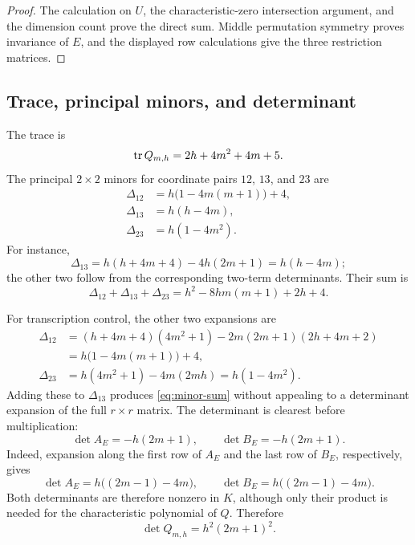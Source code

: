 \documentclass[11pt]{article}
\theoremstyle{remark}
\numberwithin{equation}{section}
\begin{document}
\begin{proof}
The calculation on \(U\), the characteristic-zero intersection argument,
and the dimension count prove the direct sum.  Middle permutation symmetry
proves invariance of \(E\), and the displayed row calculations give the
three restriction matrices.
\end{proof}

\subsection{Trace, principal minors, and determinant}

The trace is
\begin{equation}\label{eq:Q-trace}
\operatorname{tr} Q_{m,h}=2h+4m^2+4m+5.
\end{equation}
The principal \(2\times2\) minors for coordinate pairs \(12\), \(13\), and
\(23\) are
\begin{align}
\Delta_{12}
&=h\bigl(1-4m(m+1)\bigr)+4,
\label{eq:minor-12}\\
\Delta_{13}
&=h(h-4m),
\label{eq:minor-13}\\
\Delta_{23}
&=h(1-4m^2).
\label{eq:minor-23}
\end{align}
For instance,
\[
\Delta_{13}
=h(h+4m+4)-4h(2m+1)=h(h-4m);
\]
the other two follow from the corresponding two-term determinants.  Their
sum is
\begin{equation}\label{eq:minor-sum}
\Delta_{12}+\Delta_{13}+\Delta_{23}
=h^2-8hm(m+1)+2h+4.
\end{equation}

For transcription control, the other two expansions are
\begin{align*}
\Delta_{12}
&=(h+4m+4)(4m^2+1)
-2m(2m+1)(2h+4m+2)\\
&=h\bigl(1-4m(m+1)\bigr)+4,
\\
\Delta_{23}
&=h(4m^2+1)-4m(2mh)
=h(1-4m^2).
\end{align*}
Adding these to \(\Delta_{13}\) produces
\eqref{eq:minor-sum} without appealing to a determinant expansion of the
full \(r\times r\) matrix.
The determinant is clearest before multiplication:
\begin{equation}\label{eq:det-AE-BE}
\det A_E=-h(2m+1),\qquad
\det B_E=-h(2m+1).
\end{equation}
Indeed, expansion along the first row of \(A_E\) and the last row of
\(B_E\), respectively, gives
\[
\det A_E
=h\bigl((2m-1)-4m\bigr),
\qquad
\det B_E
=h\bigl((2m-1)-4m\bigr).
\]
Both determinants are therefore nonzero in \(K\), although only their
product is needed for the characteristic polynomial of \(Q\).
Therefore
\begin{equation}\label{eq:det-Q}
\det Q_{m,h}=h^2(2m+1)^2.
\end{equation}
\end{document}
